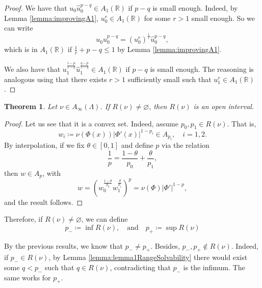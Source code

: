 \documentclass[12pt]{amsart}
\newcommand{\R}{\mathbb{R}}
\theoremstyle{plain}
\newtheorem{theorem}{Theorem}[section]
\theoremstyle{definition}
\numberwithin{equation}{section}
\begin{document}
\begin{proof}
    We have that $u_0\widehat{u}_0^{p-q}\in A_1(\R)$ if  $p-q$ is small enough. Indeed, by Lemma \ref{lemma:improvingA1}, $u_0^{r}\in A_1(\R)$ for some $r>1$ small enough. So we can write
    \[
    u_0\widehat{u}_0^{p-q}
    =
    (u_0^{r})^{\frac{1}{r}}\widehat{u}_{0}^{p-q},
    \]
    which is in $A_1(\R)$ if $\frac{1}{r}+p-q\leq 1$ by Lemma \ref{lemma:improvingA1}. 


    We also have that $u_1^{\frac{1-p}{1-q}}\widehat{u}_{1}^{\frac{q-p}{1-q}}\in A_1(\R)$ if $p-q$ is small enough. The reasoning is analogous using that  there exists $r>1$ sufficiently small such that  $u_1^r\in A_1(\R)$. 
\end{proof}


\begin{theorem}\label{lemma:lemma2RangeSolvability}
    Let $\nu\in A_{\infty}(\Lambda)$. If $R(\nu)\neq\varnothing$, then $R(\nu)$ is an open interval. \end{theorem}

\begin{proof}
    Let us see that it is a convex set. Indeed, assume $p_0,p_1\in R(\nu)$. That is,
    \[
    w_i\coloneqq \nu(\Phi(x))|\Phi'(x)|^{1-p_i}\in A_{p_i},\quad i=1,2. 
    \]
    By interpolation, if we fix $\theta\in [0,1]$ and define $p$ via the relation
    \begin{equation}\label{eq:convexLinearCombinationLemma}
    \frac{1}{p}=\frac{1-\theta}{p_0}+\frac{\theta}{p_1},    
    \end{equation}
    then $w\in A_p$, with
    \[
    w
    =
    (w_0^{\frac{1-\theta}{p_0}}w_{1}^{\frac{\theta}{p_1}})^p
    =
    \nu(\Phi)|\Phi'|^{1-p},
    \]
    and the result follows.
   \end{proof}




Therefore, if $R(\nu)\neq \varnothing$,  we can define
\begin{equation}\label{eq:p-}
p_{-}\coloneqq \inf R(\nu), \quad\mbox{and}\quad  p_{+}
    \coloneqq    \sup{R(\nu)}
\end{equation}

By the previous results, we know that $p_{-}\neq p_{+}$. Besides, $p_{-},p_{+}\not\in R(\nu)$. Indeed, if $p_{-}\in R(\nu)$, by Lemma \ref{lemma:lemma1RangeSolvability} there would exist some $q<p_{-}$ such that $q\in R(\nu)$, contradicting that $p_{-}$ is the infimum. The same works for $p_{+}$. 


 
\end{document}
